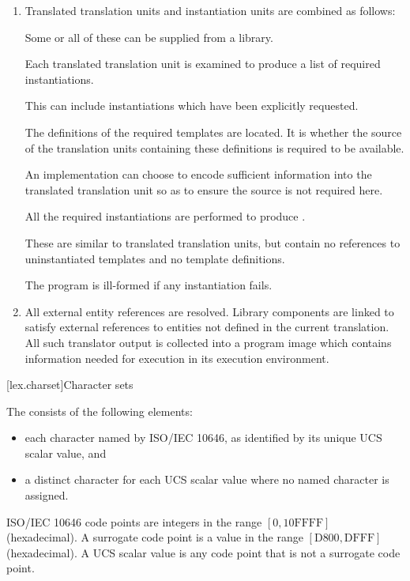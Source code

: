 \documentclass{wg21}
\newenvironment{removedtrblock}
{
    \color{magenta}
}
{
    \color{black}
}
\begin{document}
\begin{enumerate}
    \item Translated translation units and instantiation units are combined
    as follows:
    \begin{note}
        Some or all of these can be supplied from a
        library.
    \end{note}
    Each translated translation unit is examined to
    produce a list of required instantiations.
    \begin{note}
        This can include
        instantiations which have been explicitly
        requested.
    \end{note}
    The definitions of the
    required templates are located. It is  whether the
    source of the translation units containing these definitions is required
    to be available.
    \begin{note}
        An implementation can choose to encode sufficient
        information into the translated translation unit so as to ensure the
        source is not required here.
    \end{note}
    All the required instantiations
    are performed to produce
    .
    \begin{note}
        These are similar
        to translated translation units, but contain no references to
        uninstantiated templates and no template definitions.
    \end{note}
    The
    program is ill-formed if any instantiation fails.

    \item All external entity references are resolved. Library
    components are linked to satisfy external references to
    entities not defined in the current translation. All such translator
    output is collected into a program image which contains information
    needed for execution in its execution environment.%
\end{enumerate}

\pagebreak
{}[lex.charset]{Character sets}

\pnum
{}%
\begin{removedtrblock}
The  consists of the following elements:
\begin{itemize}
    \item
    each character named by ISO/IEC 10646,
    as identified by its unique UCS scalar value, and
    \item
    a distinct character for each UCS scalar value
    where no named character is assigned.
\end{itemize}
\begin{note}
    ISO/IEC 10646 code points are integers
    in the range $[0, \mathrm{10FFFF}]$ (hexadecimal).
    A surrogate code point is a value
    in the range $[\mathrm{D800}, \mathrm{DFFF}]$ (hexadecimal).
    A UCS scalar value is any code point that is not a surrogate code point.
\end{note}
\end{removedtrblock}
\end{document}
